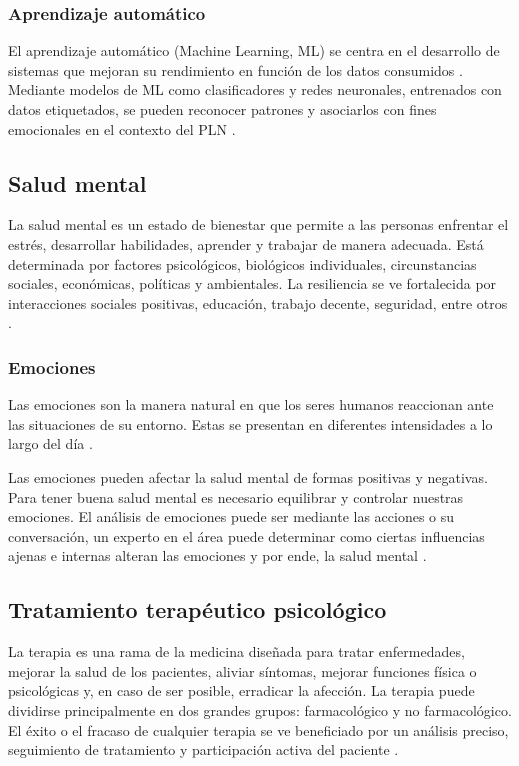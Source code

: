 \documentclass[12pt,twoside]{article}
\begin{document}
	\subsubsection{Aprendizaje automático}
	
	El aprendizaje automático (Machine Learning, ML) se centra en el desarrollo de sistemas que mejoran su rendimiento en función de los datos consumidos \cite{info: ml}. Mediante modelos de ML como clasificadores y redes neuronales, entrenados con datos etiquetados, se pueden reconocer patrones y asociarlos con fines emocionales en el contexto del PLN \cite{info: pln3}.
	
	\subsection{Salud mental}
	
	La salud mental es un estado de bienestar que permite a las personas enfrentar el estrés, desarrollar habilidades, aprender y trabajar de manera adecuada. 
	Está determinada por factores psicológicos, biológicos individuales, circunstancias sociales, económicas, políticas y ambientales. La resiliencia se ve fortalecida por interacciones sociales positivas, educación, trabajo decente, seguridad, entre otros \cite{info: salud1}.

	
	\subsubsection{Emociones}
	Las emociones son la manera natural en que los seres humanos reaccionan ante las situaciones de su entorno. Estas se presentan en diferentes intensidades a lo largo del día \cite{info: salud2}. 
	
	Las emociones pueden afectar la salud mental de formas positivas y negativas. Para tener buena salud mental es necesario equilibrar y controlar nuestras emociones. El análisis de emociones puede ser mediante las acciones o su conversación, un experto en el área puede determinar como ciertas influencias ajenas e internas alteran las emociones y por ende, la salud mental \cite{info: salud3}.
	
	\subsection{Tratamiento terapéutico psicológico}
	
	La terapia es una rama de la medicina diseñada para tratar enfermedades, mejorar la salud de los pacientes, aliviar síntomas, mejorar funciones física o psicológicas y, en caso de ser posible, erradicar la afección. La terapia puede dividirse principalmente en dos grandes grupos: farmacológico y no farmacológico. El éxito o el fracaso de cualquier terapia se ve beneficiado por un análisis preciso, seguimiento de tratamiento y participación activa del paciente \cite{info: terapia1}. 
	
\end{document}
